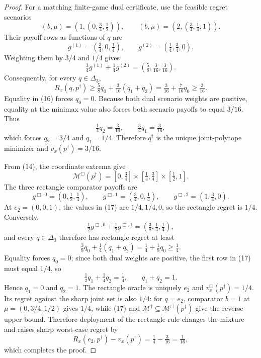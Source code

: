 \documentclass{article}
\begin{document}
\begin{proof}
For a matching finite-game dual certificate, use the feasible regret scenarios
\[
 (b,\mu)=\left(1,(0,\tfrac34,\tfrac12)\right),
 \qquad
 (b,\mu)=\left(2,(\tfrac34,\tfrac14,1)\right).
\]
Their payoff rows as functions of \(q\) are
\[
 g^{(1)}=(\tfrac34,0,\tfrac14),
 \qquad
 g^{(2)}=(\tfrac14,\tfrac34,0).
\]
Weighting them by \(3/4\) and \(1/4\) gives
\[
 \tfrac34g^{(1)}+\tfrac14g^{(2)}
 =\left(\tfrac58,\tfrac3{16},\tfrac3{16}\right).
\]
Consequently, for every \(q\in\Delta_3\),
\[
R_x(q,p^\dagger)
\geq\tfrac58q_0+\tfrac3{16}(q_1+q_2)
=\tfrac3{16}+\tfrac7{16}q_0
\geq\tfrac3{16}.
\tag{16}
\]
Equality in (16) forces \(q_0=0\).  Because both dual scenario weights are positive, equality at the minimax value also forces both scenario payoffs to equal \(3/16\).  Thus
\[
 \tfrac14q_2=\tfrac3{16},
 \qquad
 \tfrac34q_1=\tfrac3{16},
\]
which forces \(q_2=3/4\) and \(q_1=1/4\).  Therefore \(q^\dagger\) is the unique joint-polytope minimizer and \(v_x(p^\dagger)=3/16\).

From (14), the coordinate extrema give
\[
 \mathcal M^{\Box}(p^\dagger)
 =[0,\tfrac34]\times[\tfrac14,\tfrac34]\times[\tfrac12,1].
\]
The three rectangle comparator payoffs are
\[
 g^{\Box,0}=(0,\tfrac12,\tfrac14),\qquad
 g^{\Box,1}=(\tfrac34,0,\tfrac14),\qquad
 g^{\Box,2}=(1,\tfrac34,0).
\tag{17}
\]
At \(e_2=(0,0,1)\), the values in (17) are \(1/4,1/4,0\), so the rectangle regret is \(1/4\).  Conversely,
\[
 \tfrac12g^{\Box,0}+\tfrac12g^{\Box,1}
 =\left(\tfrac38,\tfrac14,\tfrac14\right),
\]
and every \(q\in\Delta_3\) therefore has rectangle regret at least
\[
 \tfrac38q_0+\tfrac14(q_1+q_2)
 =\tfrac14+\tfrac18q_0\geq\tfrac14.
\tag{18}
\]
Equality forces \(q_0=0\); since both dual weights are positive, the first row in (17) must equal \(1/4\), so
\[
 \tfrac12q_1+\tfrac14q_2=\tfrac14,
 \qquad q_1+q_2=1.
\]
Hence \(q_1=0\) and \(q_2=1\).  The rectangle oracle is uniquely \(e_2\) and \(v_x^{\Box}(p^\dagger)=1/4\).  Its regret against the sharp joint set is also \(1/4\): for \(q=e_2\), comparator \(b=1\) at \(\mu=(0,3/4,1/2)\) gives \(1/4\), while (17) and \(\mathcal M^\dagger\subseteq\mathcal M^{\Box}(p^\dagger)\) give the reverse upper bound.  Therefore deployment of the rectangle rule changes the mixture and raises sharp worst-case regret by
\[
 R_x(e_2,p^\dagger)-v_x(p^\dagger)
 =\tfrac14-\tfrac3{16}=\tfrac1{16},
\]
which completes the proof.
\end{proof}
\end{document}
